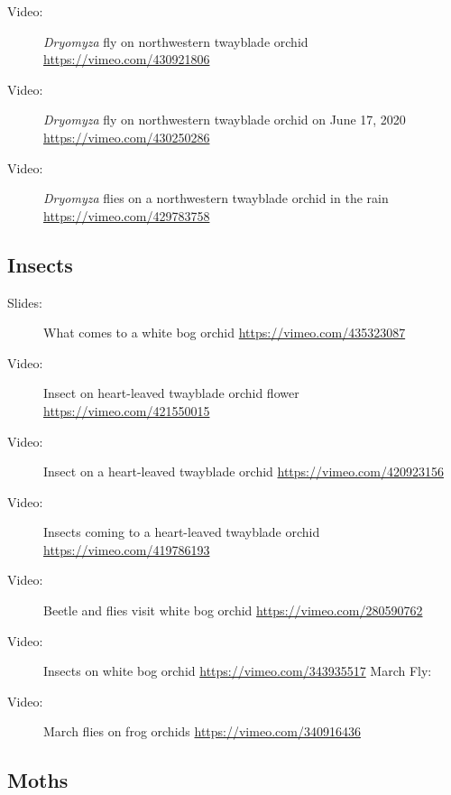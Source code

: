 \begin{description}
\item[Video:]  \emph{Dryomyza} fly on northwestern twayblade orchid \url{https://vimeo.com/430921806}
\item[Video:]  \emph{Dryomyza} fly on northwestern twayblade orchid on June 17, 2020 \url{https://vimeo.com/430250286}
\item[Video:]  \emph{Dryomyza} flies on a northwestern twayblade orchid in the rain \url{https://vimeo.com/429783758}
\end{description}

\subsection{Insects}

\begin{description}
\item[Slides:] What comes to a white bog orchid \url{https://vimeo.com/435323087} 
\item[Video:]  Insect on heart-leaved twayblade orchid flower \url{https://vimeo.com/421550015}
\item[Video:]  Insect on a heart-leaved twayblade orchid \url{https://vimeo.com/420923156}
\item[Video:]  Insects coming to a heart-leaved twayblade orchid \url{https://vimeo.com/419786193}
\item[Video:]  Beetle and flies visit white bog orchid \url{https://vimeo.com/280590762}
\item[Video:]  Insects on white bog orchid \url{https://vimeo.com/343935517}
March Fly:
\item[Video:]  March flies on frog orchids \url{https://vimeo.com/340916436}
\end{description}

\subsection{Moths}

